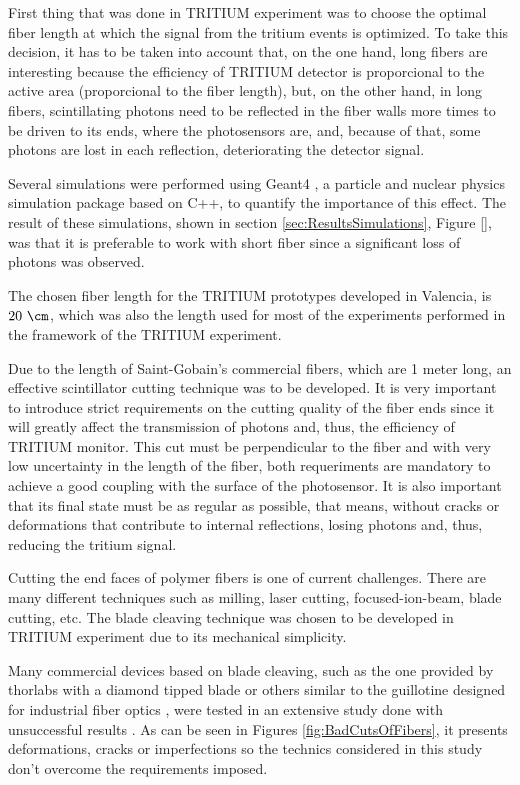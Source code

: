 First thing that was done in TRITIUM experiment was to choose the optimal fiber length at which the signal from the tritium events is optimized. To take this decision, it has to be taken into account that, on the one hand, long fibers are interesting because the efficiency of TRITIUM detector is proporcional to the active area (proporcional to the fiber length), but, on the other hand, in long fibers, scintillating photons need to be reflected in the fiber walls more times to be driven to its ends, where the photosensors are, and, because of that, some photons are lost in each reflection, deteriorating the detector signal.

Several simulations were performed using Geant4 \cite{Geant4WebPage}, a particle and nuclear physics simulation package based on C++, to quantify the importance of this effect. The result of these simulations, shown in section \ref{sec:ResultsSimulations}, Figure \ref{}, was that it is preferable to work with short fiber since a significant loss of photons was observed.

The chosen fiber length for the TRITIUM prototypes developed in Valencia, is $20~\cm$, which was also the length used for most of the experiments performed in the framework of the TRITIUM experiment. 

Due to the length of Saint-Gobain's commercial fibers, which are 1 meter long, an effective scintillator cutting technique was to be developed. It is very important to introduce strict requirements on the cutting quality of the fiber ends since it will greatly affect the transmission of photons and, thus, the efficiency of TRITIUM monitor. This cut must be perpendicular to the fiber and with very low uncertainty in the length of the fiber, both requeriments are mandatory to achieve a good coupling with the surface of the photosensor. It is also important that its final state must be as regular as possible, that means, without cracks or deformations that contribute to internal reflections, losing photons and, thus, reducing the tritium signal.

Cutting the end faces of polymer fibers is one of current challenges. There are many different techniques such as milling, laser cutting, focused-ion-beam, blade cutting, etc. The blade cleaving technique was chosen to be developed in TRITIUM experiment due to its mechanical simplicity. %

Many commercial devices based on blade cleaving, such as the one provided by thorlabs with a diamond tipped blade \cite{DiamondThorlabs} or others similar to the guillotine designed for industrial fiber optics \cite{GuillotineIFO}, were tested in an extensive study done with unsuccessful results \cite{TFGAlberto}. As can be seen in Figures \ref{fig:BadCutsOfFibers}, it presents deformations, cracks or imperfections so the technics considered in this study don't overcome the requirements imposed.

